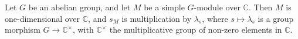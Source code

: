 Let $G$ be an abelian group, and let $M$ be a simple $G$-module over $\mathbb{C}$. Then $M$ is one-dimensional over $\mathbb{C}$, and $s_M$ is multiplication by $\lambda_s$, where $s \mapsto \lambda_s$ is a group morphism $G \rightarrow \mathbb{C}^\times$, with $\mathbb{C}^\times$ the multiplicative group of non-zero elements in $\mathbb{C}$.
